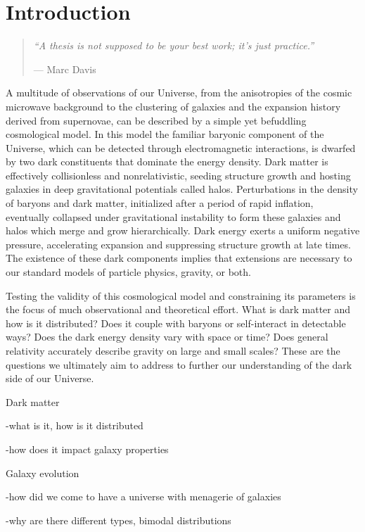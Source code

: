 \chapter{Introduction}
\label{chap:intro}

\begin{quote}{\textit{``A thesis is not supposed to be your best work; it's just
  practice.''}

--- Marc Davis}
\end{quote}


A multitude of observations of our Universe, from the anisotropies of
the cosmic microwave background to the clustering of galaxies and the
expansion history derived from supernovae, can be described by a
simple yet befuddling cosmological model. In this model the familiar
baryonic component of the Universe, which can be detected through
electromagnetic interactions, is dwarfed by two dark constituents that
dominate the energy density. Dark matter is effectively collisionless
and nonrelativistic, seeding structure growth and hosting galaxies in
deep gravitational potentials called halos. Perturbations in the
density of baryons and dark matter, initialized after a period of
rapid inflation, eventually collapsed under gravitational instability
to form these galaxies and halos which merge and grow
hierarchically. Dark energy exerts a uniform negative pressure,
accelerating expansion and suppressing structure growth at late
times. The existence of these dark components implies that extensions
are necessary to our standard models of particle physics, gravity, or
both.

Testing the validity of this cosmological model and constraining its
parameters is the focus of much observational and theoretical effort.
What is dark matter and how is it distributed?  Does it
couple with baryons or self-interact in detectable ways?  Does the
dark energy density vary with space or time? Does general
relativity accurately describe gravity on large and small scales?
These are the questions we ultimately aim to address to further our
understanding of the dark side of our Universe.


Dark matter

-what is it, how is it distributed

-how does it impact galaxy properties


Galaxy evolution

-how did we come to have a universe with menagerie of galaxies

-why are there different types, bimodal distributions

